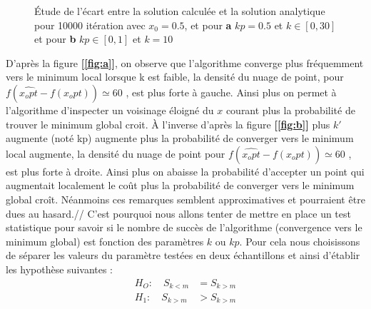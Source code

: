 \documentclass[12pt]{article}
\begin{document}
\begin{figure}[H]
  \centering
  \caption{Étude de l'écart entre la solution calculée et la solution analytique pour 10000 itération avec $x_0 = 0.5$, et pour \textbf{a} $kp=0.5$ et $k\in [0,30]$ et  pour \textbf{b} $kp \in [0,1]$ et $k= 10$}
  \label{fig:ab}
\end{figure}
D'après la figure \textbf{[\ref{fig:a}]}, on observe que l'algorithme converge plus fréquemment vers le minimum local lorsque k est faible, la densité du nuage de point, pour $f(\hat{x_opt}- f(x_opt)) \simeq 60$ , est plus forte à gauche. Ainsi plus on permet à l'algorithme d'inspecter un voisinage éloigné du $x$ courant plus  la probabilité de trouver le minimum global croit.  À l'inverse d'après la figure \textbf{[\ref{fig:b}]} plus $k'$ augmente (noté kp) augmente plus la probabilité de converger vers le minimum local augmente, la densité du nuage de point pour  $f(\hat{x_opt}- f(x_opt)) \simeq 60$ , est plus forte à droite. Ainsi plus on abaisse la probabilité d'accepter un point qui augmentait localement le coût plus la probabilité de converger vers le minimum global croît. Néanmoins ces remarques semblent approximatives et pourraient être dues au hasard.//
C'est pourquoi nous allons tenter de mettre en place un test statistique pour savoir si le nombre de succès de l'algorithme (convergence vers le minimum global) est fonction des paramètres $k$ ou $kp$. Pour cela nous choisissons de séparer les valeurs du paramètre  testées en deux échantillons et ainsi d'établir les hypothèse suivantes :
\begin{align*}
    H_O : \quad S_{k<m} &=  S_{k>m} \\
    H_1 : \quad S_{k>m} &>  S_{k>m}
\end{align*}
\end{document}
